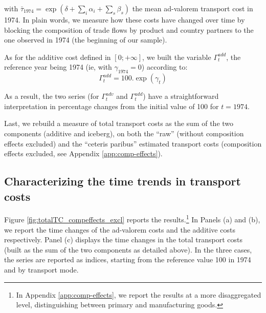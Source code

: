 \documentclass[a4paper,11pt]{article}
\begin{document}
\noindent with $\bar{\tau}_{1974} = \exp(\delta +\sum_i \alpha_i +\sum_s \beta_s)$ the mean ad-valorem transport cost in 1974. In plain words, we measure how these costs have changed over time by blocking the composition of trade flows by product and country partners to the one observed in 1974 (the beginning of our sample).

As for the additive cost defined in $[0;+\infty]$, we built the variable $\Gamma^{add}_t$, the reference year being 1974 (ie, with $\gamma_{1974}=0$) according to:
\begin{equation}
\Gamma^{add}_t = 100.\exp(\gamma_t) \label{eq:comp_effects_add}
\end{equation}

\noindent As a result, the two series (for $\Gamma^{adv}_t$ and $\Gamma^{add}_t$) have a straightforward interpretation in percentage changes from the initial value of 100 for $t=1974$.

Last, we rebuild a measure of total transport costs as the sum of the two components (additive and iceberg), on both the ``raw'' (without composition effects excluded) and the ``ceteris paribus'' estimated transport costs (composition effects excluded, see Appendix \ref{app:comp-effects}).


\subsection{Characterizing the time trends in transport costs}
Figure \ref{fig:totalTC_compeffects_excl} reports the results.\footnote{In Appendix \ref{app:comp-effects}, we report the results at a more disaggregated level, distinguishing between primary and manufacturing goods.} In Panels (a) and (b), we report the time changes of the ad-valorem costs and the additive costs respectively. Panel (c) displays the time changes in the total transport costs (built as the sum of the two components as detailed above). In the three cases, the series are reported as indices, starting from the reference value 100 in 1974 and by transport mode.
\end{document}
